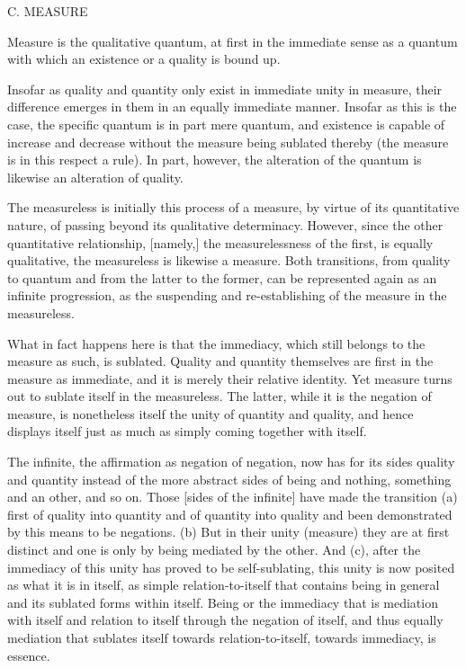 C. MEASURE

Measure is the qualitative quantum,
at first in the immediate sense as a quantum
with which an existence or a quality is bound up.

Insofar as quality and quantity only exist in immediate unity in measure,
their difference emerges in them in an equally immediate manner.
Insofar as this is the case, the specific quantum is in part mere quantum, and
existence is capable of increase and decrease without the measure
being sublated thereby (the measure is in this respect a rule).
In part, however, the alteration of the quantum is
likewise an alteration of quality.

The measureless is initially this process of a measure,
by virtue of its quantitative nature,
of passing beyond its qualitative determinacy.
However, since the other quantitative relationship, [namely,]
the measurelessness of the first, is equally qualitative,
the measureless is likewise a measure.
Both transitions, from quality to quantum and
from the latter to the former,
can be represented again as an infinite progression,
as the suspending and re-establishing of
the measure in the measureless.

What in fact happens here is that the immediacy,
which still belongs to the measure as such, is sublated.
Quality and quantity themselves are first
in the measure as immediate,
and it is merely their relative identity.
Yet measure turns out to sublate itself in the measureless.
The latter, while it is the negation of measure, is
nonetheless itself the unity of quantity and quality,
and hence displays itself just as much as
simply coming together with itself.

The infinite, the affirmation as negation of negation,
now has for its sides quality and quantity instead of
the more abstract sides of being and nothing,
something and an other, and so on.
Those [sides of the infinite] have made the transition
(a) first of quality into quantity and
of quantity into quality and been demonstrated
by this means to be negations.
(b) But in their unity (measure) they are at first distinct and
one is only by being mediated by the other.
And (c), after the immediacy of this unity
has proved to be self-sublating,
this unity is now posited as what it is in itself,
as simple relation-to-itself that contains
being in general and its sublated forms within itself.
Being or the immediacy that is mediation with itself and
relation to itself through the negation of itself, and
thus equally mediation that sublates itself
towards relation-to-itself, towards immediacy, is essence.
